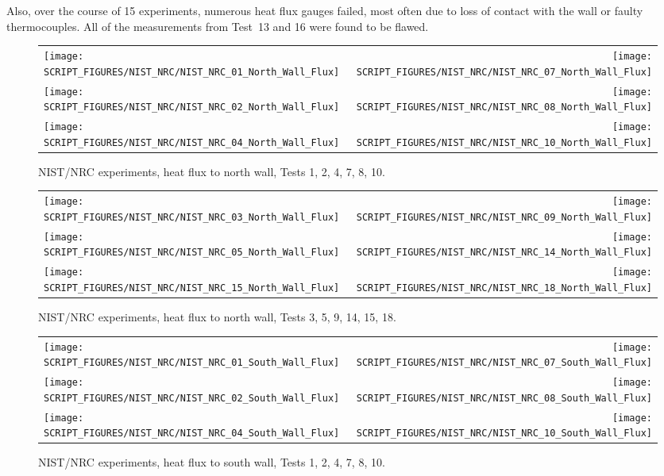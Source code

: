 Also, over the course of 15 experiments, numerous heat flux gauges failed, most often due to loss of contact with the wall or faulty thermocouples. All of the measurements from Test~13 and 16 were found to be flawed.

\newpage

\begin{figure}[p]
\begin{tabular*}{\textwidth}{l@{\extracolsep{\fill}}r}
\texttt{[image: SCRIPT\_FIGURES/NIST\_NRC/NIST\_NRC\_01\_North\_Wall\_Flux]} &
\texttt{[image: SCRIPT\_FIGURES/NIST\_NRC/NIST\_NRC\_07\_North\_Wall\_Flux]} \\
\texttt{[image: SCRIPT\_FIGURES/NIST\_NRC/NIST\_NRC\_02\_North\_Wall\_Flux]} &
\texttt{[image: SCRIPT\_FIGURES/NIST\_NRC/NIST\_NRC\_08\_North\_Wall\_Flux]} \\
\texttt{[image: SCRIPT\_FIGURES/NIST\_NRC/NIST\_NRC\_04\_North\_Wall\_Flux]} &
\texttt{[image: SCRIPT\_FIGURES/NIST\_NRC/NIST\_NRC\_10\_North\_Wall\_Flux]}
\end{tabular*}
\caption{NIST/NRC experiments, heat flux to north wall, Tests 1, 2, 4, 7, 8, 10.}
\label{NIST_NRC_North_Wall_Flux_Closed}
\end{figure}

\begin{figure}[p]
\begin{tabular*}{\textwidth}{l@{\extracolsep{\fill}}r}
\texttt{[image: SCRIPT\_FIGURES/NIST\_NRC/NIST\_NRC\_03\_North\_Wall\_Flux]} &
\texttt{[image: SCRIPT\_FIGURES/NIST\_NRC/NIST\_NRC\_09\_North\_Wall\_Flux]} \\
\texttt{[image: SCRIPT\_FIGURES/NIST\_NRC/NIST\_NRC\_05\_North\_Wall\_Flux]} &
\texttt{[image: SCRIPT\_FIGURES/NIST\_NRC/NIST\_NRC\_14\_North\_Wall\_Flux]} \\
\texttt{[image: SCRIPT\_FIGURES/NIST\_NRC/NIST\_NRC\_15\_North\_Wall\_Flux]} &
\texttt{[image: SCRIPT\_FIGURES/NIST\_NRC/NIST\_NRC\_18\_North\_Wall\_Flux]}
\end{tabular*}
\caption{NIST/NRC experiments, heat flux to north wall, Tests 3, 5, 9, 14, 15, 18.}
\label{NIST_NRC_North_Wall_Flux_Open}
\end{figure}

\begin{figure}[p]
\begin{tabular*}{\textwidth}{l@{\extracolsep{\fill}}r}
\texttt{[image: SCRIPT\_FIGURES/NIST\_NRC/NIST\_NRC\_01\_South\_Wall\_Flux]} &
\texttt{[image: SCRIPT\_FIGURES/NIST\_NRC/NIST\_NRC\_07\_South\_Wall\_Flux]} \\
\texttt{[image: SCRIPT\_FIGURES/NIST\_NRC/NIST\_NRC\_02\_South\_Wall\_Flux]} &
\texttt{[image: SCRIPT\_FIGURES/NIST\_NRC/NIST\_NRC\_08\_South\_Wall\_Flux]} \\
\texttt{[image: SCRIPT\_FIGURES/NIST\_NRC/NIST\_NRC\_04\_South\_Wall\_Flux]} &
\texttt{[image: SCRIPT\_FIGURES/NIST\_NRC/NIST\_NRC\_10\_South\_Wall\_Flux]}
\end{tabular*}
\caption{NIST/NRC experiments, heat flux to south wall, Tests 1, 2, 4, 7, 8, 10.}
\label{NIST_NRC_South_Wall_Flux_Closed}
\end{figure}


